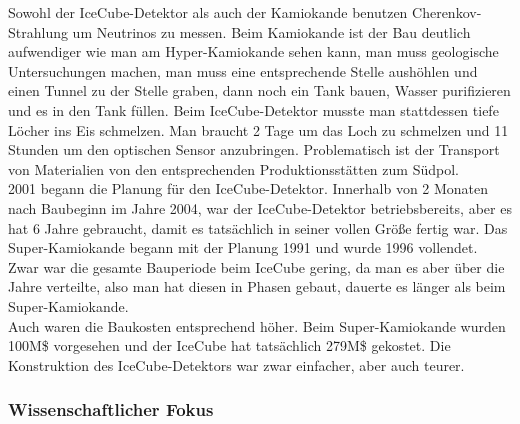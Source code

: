 Sowohl der IceCube-Detektor als auch der Kamiokande benutzen Cherenkov-Strahlung um Neutrinos zu messen.
Beim Kamiokande ist der Bau deutlich aufwendiger wie man am Hyper-Kamiokande sehen kann, man muss geologische Untersuchungen 
machen, man muss eine entsprechende Stelle aushöhlen und einen Tunnel zu der Stelle graben, dann noch ein Tank bauen, 
Wasser purifizieren und es in den Tank füllen. \cite{Lodovico2017} 
Beim IceCube-Detektor musste man stattdessen tiefe Löcher ins Eis schmelzen. Man braucht 2 Tage um das Loch zu schmelzen
und 11 Stunden um den optischen Sensor anzubringen. Problematisch ist der Transport von Materialien von den entsprechenden
Produktionsstätten zum Südpol.  \\
2001 begann die Planung für den IceCube-Detektor. Innerhalb von 2 Monaten nach Baubeginn im Jahre 2004, war der IceCube-Detektor 
betriebsbereits, aber es hat 6 Jahre gebraucht, damit es tatsächlich in seiner vollen Größe fertig war. 
Das Super-Kamiokande begann mit der Planung 1991 und wurde 1996 vollendet.
Zwar war die gesamte Bauperiode beim IceCube gering, da man es aber über die Jahre verteilte, also man hat diesen in Phasen
gebaut, dauerte es länger als beim Super-Kamiokande.  \\
Auch waren die Baukosten entsprechend höher. Beim Super-Kamiokande wurden 100M\$ vorgesehen und der IceCube hat tatsächlich 
279M\$ gekostet. 
Die Konstruktion des IceCube-Detektors war zwar einfacher, aber auch teurer. 

\subsubsection{Wissenschaftlicher Fokus}

